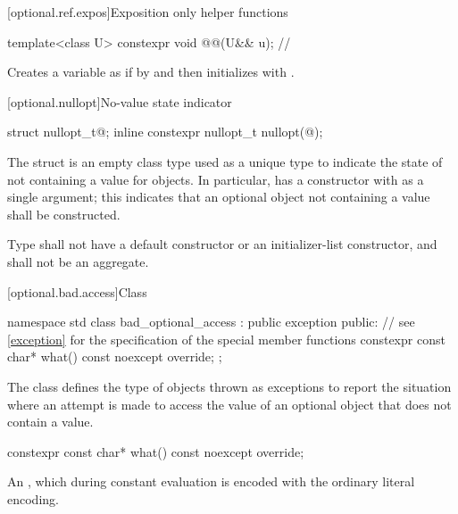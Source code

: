 [optional.ref.expos]{Exposition only helper functions}

\begin{itemdecl}
template<class U>
  constexpr void @@(U&& u);  // \expos
\end{itemdecl}

\begin{itemdescr}
\pnum
\effects
Creates a variable  as if by 
and then initializes  with .
\end{itemdescr}

[optional.nullopt]{No-value state indicator}

%
%
\begin{itemdecl}
struct nullopt_t{@\seebelow@};
inline constexpr nullopt_t nullopt(@\unspec@);
\end{itemdecl}

\pnum
The struct  is an empty class type used as a unique type to indicate the state of not containing a value for  objects.
In particular,  has a constructor with  as a single argument;
this indicates that an optional object not containing a value shall be constructed.

\pnum
Type  shall not have a default constructor or an initializer-list constructor, and shall not be an aggregate.

[optional.bad.access]{Class }

\begin{codeblock}
namespace std {
  class bad_optional_access : public exception {
  public:
    // see \ref{exception} for the specification of the special member functions
    constexpr const char* what() const noexcept override;
  };
}
\end{codeblock}

\pnum
The class  defines the type of objects thrown as exceptions to report the situation where an attempt is made to access the value of an optional object that does not contain a value.

%
\begin{itemdecl}
constexpr const char* what() const noexcept override;
\end{itemdecl}

\begin{itemdescr}
\pnum
\returns
An  \ntbs{},
which during constant evaluation is encoded with
the ordinary literal encoding.
\end{itemdescr}

